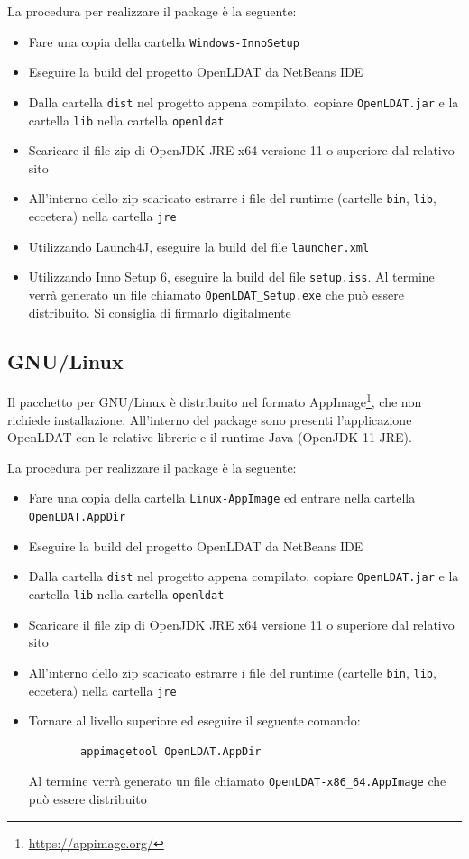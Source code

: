 La procedura per realizzare il package è la seguente:\begin{itemize}
	\item Fare una copia della cartella \texttt{Windows-InnoSetup}
	\item Eseguire la build del progetto OpenLDAT da NetBeans IDE
	\item Dalla cartella \texttt{dist} nel progetto appena compilato, copiare \texttt{OpenLDAT.jar} e la cartella \texttt{lib} nella cartella \texttt{openldat}
	\item Scaricare il file zip di OpenJDK JRE x64 versione 11 o superiore dal relativo sito
	\item All'interno dello zip scaricato estrarre i file del runtime (cartelle \texttt{bin}, \texttt{lib}, eccetera) nella cartella \texttt{jre}
	\item Utilizzando Launch4J, eseguire la build del file \texttt{launcher.xml}
	\item Utilizzando Inno Setup 6, eseguire la build del file \texttt{setup.iss}. Al termine verrà generato un file chiamato \texttt{OpenLDAT\_Setup.exe} che può essere distribuito. Si consiglia di firmarlo digitalmente
\end{itemize}

\subsection{GNU/Linux}
Il pacchetto per GNU/Linux è distribuito nel formato AppImage\footnote{\url{https://appimage.org/}}, che non richiede installazione. All'interno del package sono presenti l'applicazione OpenLDAT con le relative librerie e il runtime Java (OpenJDK 11 JRE).

La procedura per realizzare il package è la seguente:\begin{itemize}
	\item Fare una copia della cartella \texttt{Linux-AppImage} ed entrare nella cartella \texttt{OpenLDAT.AppDir}
	\item Eseguire la build del progetto OpenLDAT da NetBeans IDE
	\item Dalla cartella \texttt{dist} nel progetto appena compilato, copiare \texttt{OpenLDAT.jar} e la cartella \texttt{lib} nella cartella \texttt{openldat}
	\item Scaricare il file zip di OpenJDK JRE x64 versione 11 o superiore dal relativo sito
	\item All'interno dello zip scaricato estrarre i file del runtime (cartelle \texttt{bin}, \texttt{lib}, eccetera) nella cartella \texttt{jre}
	\item Tornare al livello superiore ed eseguire il seguente comando:\begin{verbatim}
		appimagetool OpenLDAT.AppDir
	\end{verbatim}
	Al termine verrà generato un file chiamato \texttt{OpenLDAT-x86\_64.AppImage} che può essere distribuito
\end{itemize}


